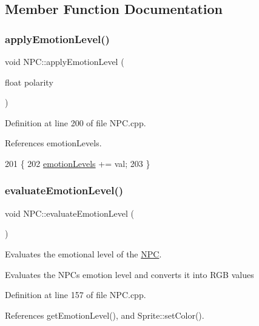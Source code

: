 \subsection{Member Function Documentation}
\mbox{\label{class_n_p_c_a3cb8421a139170f47247b1e126eb722b}} 
\subsubsection{\texorpdfstring{apply\+Emotion\+Level()}{applyEmotionLevel()}}
{\footnotesize\ttfamily void N\+P\+C\+::apply\+Emotion\+Level (\begin{DoxyParamCaption}\item[{float}]{polarity }\end{DoxyParamCaption})}



Definition at line 200 of file N\+P\+C.\+cpp.



References emotion\+Levels.


\begin{DoxyCode}
201 \{
202     \hyperlink{class_n_p_c_a804b5c812457417231e3b4ab5e06ac88}{emotionLevels} += val;
203 \}
\end{DoxyCode}
\mbox{\label{class_n_p_c_a278f18152374a82602f57f98c0a43800}} 
\subsubsection{\texorpdfstring{evaluate\+Emotion\+Level()}{evaluateEmotionLevel()}}
{\footnotesize\ttfamily void N\+P\+C\+::evaluate\+Emotion\+Level (\begin{DoxyParamCaption}{ }\end{DoxyParamCaption})}



Evaluates the emotional level of the \hyperlink{class_n_p_c}{N\+PC}. 

Evaluates the N\+P\+Cs emotion level and converts it into R\+GB values 

Definition at line 157 of file N\+P\+C.\+cpp.



References get\+Emotion\+Level(), and Sprite\+::set\+Color().


